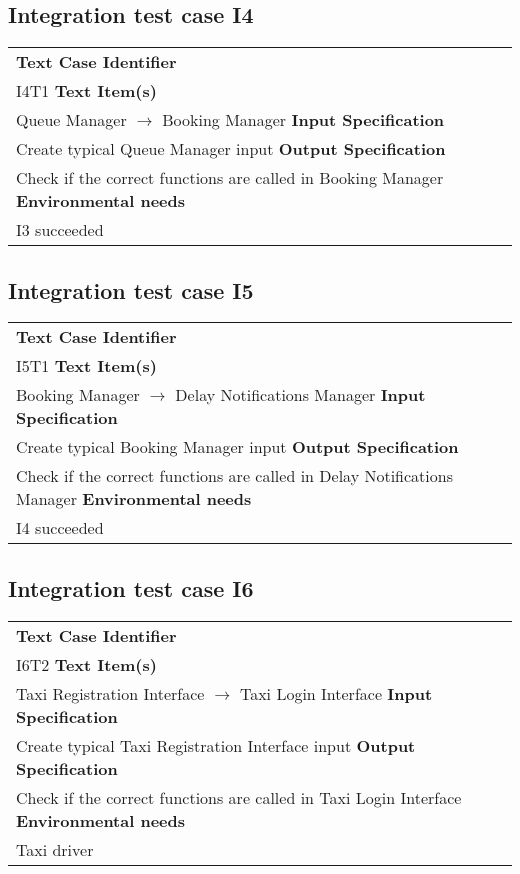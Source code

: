 \subsection{Integration test case I4}
	\begin{tabular} {ll}
		\hline \textbf{Text Case Identifier} & \\ I4T1
		\hline \textbf{Text Item(s)} & \\ Queue Manager $\rightarrow$ Booking Manager
		\hline \textbf{Input Specification} & \\ Create typical Queue Manager input
		\hline \textbf{Output Specification} & \\ Check if the correct functions are called in Booking Manager
		\hline \textbf{Environmental needs} & \\ I3 succeeded
		\hline 
	\end{tabular}
\subsection{Integration test case I5}
	\begin{tabular} {ll}
		\hline \textbf{Text Case Identifier} & \\ I5T1
		\hline \textbf{Text Item(s)} & \\ Booking Manager $\rightarrow$ Delay Notifications Manager
		\hline \textbf{Input Specification} & \\ Create typical Booking Manager input
		\hline \textbf{Output Specification} & \\ Check if the correct functions are called in Delay Notifications Manager
		\hline \textbf{Environmental needs} & \\ I4 succeeded
		\hline 
	\end{tabular}
\subsection{Integration test case I6}
	\begin{tabular} {ll}
		\hline \textbf{Text Case Identifier} & \\ I6T2
		\hline \textbf{Text Item(s)} & \\ Taxi Registration Interface $\rightarrow$ Taxi Login Interface
		\hline \textbf{Input Specification} & \\ Create typical Taxi Registration Interface input
		\hline \textbf{Output Specification} & \\ Check if the correct functions are called in Taxi Login Interface
		\hline \textbf{Environmental needs} & \\ Taxi driver
		\hline 
	\end{tabular}